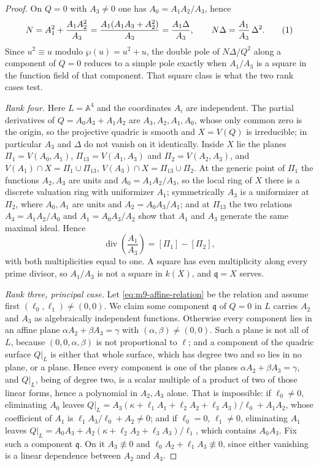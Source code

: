 \begin{proof}
On $Q=0$ with $A_3\neq0$ one has $A_0=A_1A_2/A_3$, hence
\[
 N=A_1^2+\frac{A_1A_2^2}{A_3}=\frac{A_1(A_1A_3+A_2^2)}{A_3}
  =\frac{A_1\Delta}{A_3},
 \qquad
 N\Delta=\frac{A_1}{A_3}\,\Delta^2 .
 \autoeqtag{eq:m9-double-pole}
\]
Since $u^2\equiv u$ modulo $\wp(u)=u^2+u$, the double pole of $N\Delta/Q^2$
along a component of $Q=0$ reduces to a simple pole exactly when $A_1/A_3$ is
a square in the function field of that component.  That square class is what
the two rank cases test.

\emph{Rank four.}  Here $L=\mathbb A^4$ and the coordinates $A_i$ are
independent.  The partial derivatives of $Q=A_0A_3+A_1A_2$ are
$A_3,A_2,A_1,A_0$, whose only common zero is the origin, so the projective
quadric is smooth and $X=V(Q)$ is irreducible; in particular $A_3$ and
$\Delta$ do not vanish on it identically.  Inside $X$ lie the planes
$\Pi_1=V(A_0,A_1)$, $\Pi_{13}=V(A_1,A_3)$ and $\Pi_2=V(A_2,A_3)$, and
$V(A_1)\cap X=\Pi_1\cup\Pi_{13}$, $V(A_3)\cap X=\Pi_{13}\cup\Pi_2$.  At the
generic point of $\Pi_1$ the functions $A_2,A_3$ are units and
$A_0=A_1A_2/A_3$, so the local ring of $X$ there is a discrete valuation ring
with uniformizer $A_1$; symmetrically $A_3$ is a uniformizer at $\Pi_2$,
where $A_0,A_1$ are units and $A_2=A_0A_3/A_1$; and at $\Pi_{13}$ the two
relations $A_3=A_1A_2/A_0$ and $A_1=A_0A_3/A_2$ show that $A_1$ and $A_3$
generate the same maximal ideal.  Hence
\[
 \operatorname{div}\left(\frac{A_1}{A_3}\right)=[\Pi_1]-[\Pi_2],
\]
with both multiplicities equal to one.  A square has even multiplicity along
every prime divisor, so $A_1/A_3$ is not a square in $k(X)$, and
$\mathfrak q=X$ serves.

\emph{Rank three, principal case.}  Let \eqref{eq:m9-affine-relation} be the
relation and assume first $(\ell_0,\ell_1)\neq(0,0)$.  We claim some
component $\mathfrak q$ of $Q=0$ in $L$ carries $A_2$ and $A_3$ as
algebraically independent functions.  Otherwise every component lies in an
affine plane $\alpha A_2+\beta A_3=\gamma$ with $(\alpha,\beta)\neq(0,0)$.
Such a plane is not all of $L$, because $(0,0,\alpha,\beta)$ is not
proportional to $\ell$; and a component of the quadric surface $Q|_L$ is
either that whole surface, which has degree two and so lies in no plane, or a
plane.  Hence every component is one of the planes
$\alpha A_2+\beta A_3=\gamma$, and $Q|_L$, being of degree two, is a scalar
multiple of a product of two of those linear forms, hence a polynomial in
$A_2,A_3$ alone.  That is impossible: if $\ell_0\neq0$,
eliminating $A_0$ leaves
$Q|_L=A_3(\kappa+\ell_1A_1+\ell_2A_2+\ell_3A_3)/\ell_0+A_1A_2$, whose
coefficient of $A_1$ is $\ell_1A_3/\ell_0+A_2\neq0$; and if $\ell_0=0$,
$\ell_1\neq0$, eliminating $A_1$ leaves
$Q|_L=A_0A_3+A_2(\kappa+\ell_2A_2+\ell_3A_3)/\ell_1$, which contains
$A_0A_3$.  Fix such a component $\mathfrak q$.  On it $A_3\not\equiv0$ and
$\ell_0A_2+\ell_1A_3\not\equiv0$, since either vanishing is a linear
dependence between $A_2$ and $A_3$.


\end{proof}
